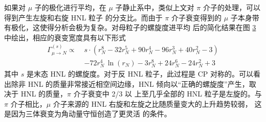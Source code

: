 \documentclass[printMode=false, declarePage=false]{ecnuthesis}
\begin{document}
如果对 $\mu$ 子的极化进行平均，在 $\mu$ 子静止系中，类似上文对 $\pi$ 介子的处理，可以得到产生左旋和右旋 HNL 粒子
的分支比。而由于 $\pi$ 介子衰变得到的 $\mu$ 子本身带有极化，这使得分析会极为复杂。对母粒子的螺旋度进平均
后的简化结果在图 \ref{fig:spec_muon_HNL_pol} 中绘出，相应的衰变宽度具有以下形式
\begin{equation}
  \begin{split}
    \Gamma_{\mu \to N}^{(s)} \propto \; & s \cdot (r_N^8-32 r_N^5+90 r_N^4-96 r_N^3+40 r_N^2-3) \\ 
                                        & -72 r_N^4 \, \ln{(r_N)} -3 r_N^8+24 r_N^6-24 r_N^2+3
  \end{split} \label{eq:mu_HNL_pol}
\end{equation}
其中 $s$ 是末态 HNL 的螺旋度。对于反 HNL 粒子，此过程是 CP 对称的。可以看出除非 HNL 的质量非常接近相空间边缘，HNL 
倾向以“正确的螺旋度”产生，取决于 HNL 的质量，$\pi$ 介子衰变中 2/3 以
上至几乎全部的 HNL 粒子是左旋的。与 $\pi$ 介子相比，$\mu$ 介子来源的 HNL 右旋和左旋之比随质量变大的上升趋势较弱，
这是因为三体衰变为角动量守恒创造了更灵活
的条件。

\begin{figure}[htbp]
  \centering
  
  \vspace{-1.5cm}
  \label{fig:spec_BR_HNL}
\end{figure}

\begin{figure}[htbp]
  \centering
  
  \vspace{-1.5cm}
  \label{fig:spec_muon_HNL}
\end{figure}


\begin{figure}[htbp]
  \centering
  
  \vspace{-1.5cm}
  \label{fig:spec_muon_HNL_pol}
\end{figure}
\end{document}
